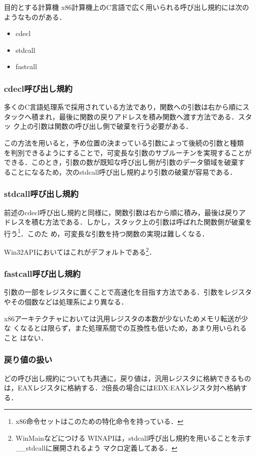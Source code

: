 \documentclass[a4paper,titlepage,report]{jsbook}
\begin{document}
\begin{resbonsiblesection}{目的とする計算機}{\kobori}
x86計算機上のC言語で広く用いられる呼び出し規約には次のようなものがある．
\begin{itemize}
 \item cdecl
 \item stdcall
 \item fastcall
\end{itemize}

\subsubsection{cdecl呼び出し規約}
多くのC言語処理系で採用されている方法であり，関数への引数は右から順にス
タックへ積まれ，最後に関数の戻りアドレスを積み関数へ渡す方法である．スタッ
ク上の引数は関数の呼び出し側で破棄を行う必要がある．

この方法を用いると，予め位置の決まっている引数によって後続の引数と種類
を判別できるようにすることで，可変長な引数のサブルーチンを実現することが
できる．このとき，引数の数が既知な呼び出し側が引数のデータ領域を破棄す
ることになるため，次のstdcall呼び出し規約より引数の破棄が容易である．

\subsubsection{stdcall呼び出し規約}
前述のcdecl呼び出し規約と同様に，関数引数は右から順に積み，最後は戻りア
ドレスを積む方法である．しかし，スタック上の引数は呼ばれた関数側が破棄を
行う\footnote{x86命令セットはこのための特化命令を持っている．}．このた
め，可変長な引数を持つ関数の実現は難しくなる．

Win32APIにおいてはこれがデフォルトである\footnote{WinMainなどにつける
WINAPIは，stdcall呼び出し規約を用いることを示す\_\_stdcallに展開されるよう
マクロ定義してある．}．

\subsubsection{fastcall呼び出し規約}
引数の一部をレジスタに置くことで高速化を目指す方法である．引数をレジスタ
やその個数などは処理系により異なる．

x86アーキテクチャにおいては汎用レジスタの本数が少ないためメモリ転送が少な
くなるとは限らず，また処理系間での互換性も低いため，あまり用いられること
はない．

\subsubsection{戻り値の扱い}
どの呼び出し規約についても共通に，戻り値は，汎用レジスタに格納できるもの
は，EAXレジスタに格納する．2倍長の場合にはEDX:EAXレジスタ対へ格納する．


\end{resbonsiblesection}
\end{document}

